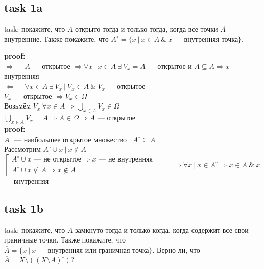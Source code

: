\documentclass[12pt]{article}
\begin{document}
\subsection*{task 1a}

task: покажите, что $A$ открыто тогда и только тогда, когда все точки $A$ --- внутренние.
Также покажите, что $A^\circ = \{ x\ |\ x \in A\ \&\ x$ --- внутренняя точка$\}$.

\textbf{proof:}\\
$\Rightarrow\quad$
$A$ --- открытое $ \Rightarrow \forall x\ |\ x \in A\ \exists\ V_x = A$ --- открытое и $A \subseteq A \Rightarrow x$ --- внутренняя\\
$\Leftarrow\quad$ $\forall x \in A\ \exists\ V_x\ |\ V_x \in A\ \&\ V_x$ --- открытое\\
$V_x$ --- открытое $\Rightarrow V_x \in \Omega$\\
Возьмём $V_x\ \forall x \in A \Rightarrow \bigcup_{x \in A} V_x \in \Omega$\\
$\bigcup_{x \in A} V_x = A \Rightarrow A \in \Omega \Rightarrow A$ --- открытое\\

\textbf{proof:}\\
$A^\circ$ --- наибольшее открытое множество $|\ A^\circ \subseteq A$\\
Рассмотрим $A^\circ \cup x\ |\ x \notin A$\\
$\left[ 
    \begin{gathered}
    A^\circ \cup x \textrm{ --- не открытое} \Rightarrow x \textrm{ --- не внутренняя}
    \\
    A^\circ \cup x \nsubseteq A \Rightarrow x \notin A
    \end{gathered}
\right.$
$\qquad\Rightarrow \forall x\ |\ x \in A^\circ \Rightarrow x \in A\ \&\ x$ --- внутренняя

\subsection*{task 1b}

task: покажите, что $A$ замкнуто тогда и только когда, когда содержит все свои граничные точки. Также покажите, что $\overline{A} = \{ x\ |\ x\text{ --- внутренняя или граничная точка}\}$. Верно ли, что $\overline{A} = X \setminus ((X\setminus A)^\circ)$?
\end{document}
